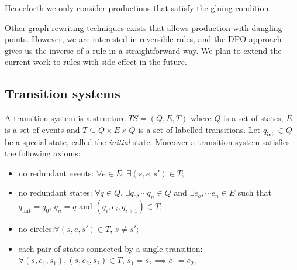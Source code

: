 Henceforth we only consider productions that satisfy the gluing condition.

\begin{remark}
Other graph rewriting techniques exists that allows production with dangling points. However, we are interested in reversible rules, and the DPO approach gives us the inverse of a rule in a straightforward way. We plan to extend the current work to rules with side effect in the future.
\end{remark}

\subsection{Transition systems}

\begin{definition}
  \label{def:ts_nielsen}
  A transition system is a structure $TS = (Q,E,T)$ where $Q$ is a set of states, $E$ is a set of events and $T\subseteq Q\times E\times Q$ is a set of labelled transitions. Let $q_{\text{init}}\in Q$ be a special state, called the \emph{initial} state. Moreover a transition system satisfies the following axioms:
  \begin{itemize}
  \item no redundant events: $\forall e\in E$, $\exists (s,e,s')\in T$;
  \item no redundant states: $\forall q\in Q$, $\exists q_0,\cdots q_n \in Q$ and $\exists e_o,\cdots e_n\in E$ such that $q_{\text{init}} = q_0$, $q_n =q$ and $(q_i,e_i,q_{i+1}) \in T$;
  \item no circles:$\forall (s,e,s')\in T$, $s\neq s'$;
  \item each pair of states connected by a single transition: $\forall (s,e_1,s_1), (s,e_2,s_2)\in T$, $s_1=s_2\implies e_1=e_2$.
  \end{itemize}
\end{definition}

